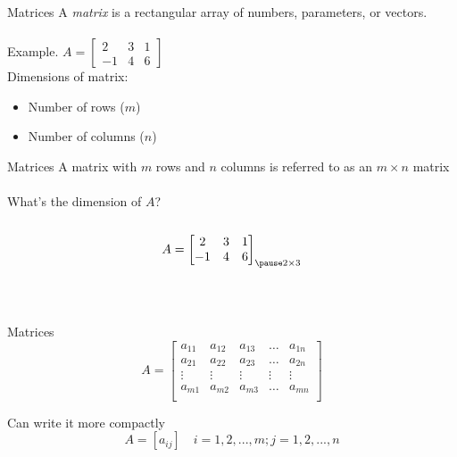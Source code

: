 \documentclass{./../../Latex/teaching_slides}
\begin{document}
\begin{frame}{Matrices}
A \textit{matrix} is a rectangular array of numbers, parameters, or vectors. \\~\\
Example. $A = \begin{bmatrix}
2 & 3 & 1 \\
-1 &4 & 6
\end{bmatrix}$ 
\vspace{2em} \\
Dimensions of matrix:
\begin{itemize}
\item Number of rows ($m$)
\item Number of columns ($n$)
\end{itemize}
\end{frame}

\begin{frame}{Matrices}
A matrix with $m$ rows and $n$ columns is referred to as an $m \times n$ matrix \\~\\
What's the dimension of $A$? \\~\\
 $$A = \begin{bmatrix}
2 & 3 & 1 \\
-1 &4 & 6
\end{bmatrix}_{\pause 2 \times 3}$$ \\~\\
\end{frame}

\begin{frame}{Matrices}
$$A = \begin{bmatrix}
a_{11} & a_{12} & a_{13} & \hdots & a_{1n} \\
a_{21} & a_{22} & a_{23} & \hdots & a_{2n} \\
\vdots & \vdots & \vdots & \vdots & \vdots \\
a_{m1} & a_{m2} & a_{m3} & \hdots & a_{mn} \\
\end{bmatrix}$$

\vspace{2em}
Can write it more compactly
$$ A = [ a_{ij} ] \quad i=1,2,...,m; j=1,2,...,n$$
\end{frame}
\end{document}
